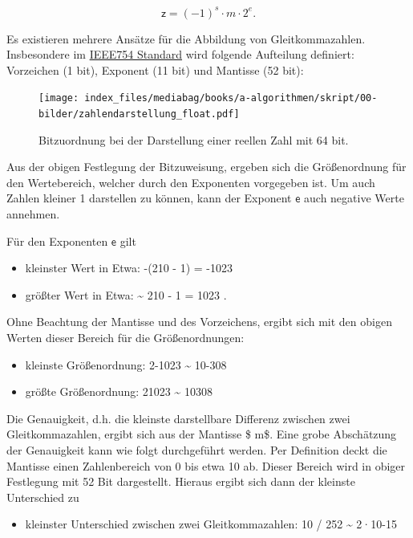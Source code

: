 \documentclass[
  letterpaper,
  DIV=11,
  numbers=noendperiod]{scrreprt}
\providecommand{\tightlist}{%
  \setlength{\itemsep}{0pt}\setlength{\parskip}{0pt}}\usepackage{longtable,booktabs,array}
\begin{document}
\[ \mathsf z = (-1)^s \cdot m \cdot 2^e .\]

Es existieren mehrere Ansätze für die Abbildung von Gleitkommazahlen.
Insbesondere im \href{https://de.wikipedia.org/wiki/IEEE_754}{IEEE754
Standard} wird folgende Aufteilung definiert: Vorzeichen (1 bit),
Exponent (11 bit) und Mantisse (52 bit):

\begin{figure}[H]

{\centering \texttt{[image: index\_files/mediabag/books/a-algorithmen/skript/00-bilder/zahlendarstellung\_float.pdf]}

}

\caption{Bitzuordnung bei der Darstellung einer reellen Zahl mit 64
bit.}

\end{figure}%

Aus der obigen Festlegung der Bitzuweisung, ergeben sich die
Größenordnung für den Wertebereich, welcher durch den Exponenten
vorgegeben ist. Um auch Zahlen kleiner 1 darstellen zu können, kann der
Exponent \(\mathsf e\) auch negative Werte annehmen.

Für den Exponenten \(\mathsf e\) gilt

\begin{itemize}
\tightlist
\item
  kleinster Wert in Etwa: -(210 - 1) = -1023
\item
  größter Wert in Etwa: \textasciitilde{} 210 - 1 = 1023 .
\end{itemize}

Ohne Beachtung der Mantisse und des Vorzeichens, ergibt sich mit den
obigen Werten dieser Bereich für die Größenordnungen:

\begin{itemize}
\tightlist
\item
  kleinste Größenordnung: 2-1023 \textasciitilde{} 10-308
\item
  größte Größenordnung: 21023 \textasciitilde{} 10308
\end{itemize}

Die Genauigkeit, d.h. die kleinste darstellbare Differenz zwischen zwei
Gleitkommazahlen, ergibt sich aus der Mantisse \$ m\$. Eine grobe
Abschätzung der Genauigkeit kann wie folgt durchgeführt werden. Per
Definition deckt die Mantisse einen Zahlenbereich von 0 bis etwa 10 ab.
Dieser Bereich wird in obiger Festlegung mit 52 Bit dargestellt. Hieraus
ergibt sich dann der kleinste Unterschied zu

\begin{itemize}
\tightlist
\item
  kleinster Unterschied zwischen zwei Gleitkommazahlen: 10 / 252
  \textasciitilde{} 2·10-15
\end{itemize}
\end{document}

